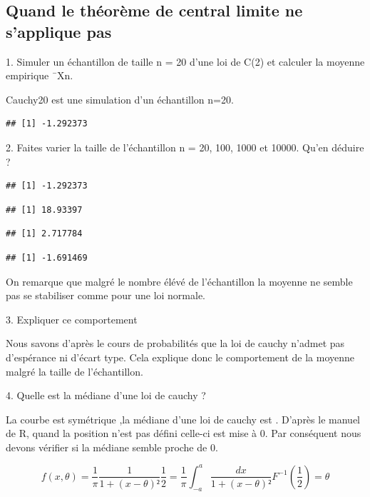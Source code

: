 \documentclass[
]{article}
\begin{document}
\hypertarget{quand-le-thuxe9oruxe8me-de-central-limite-ne-sapplique-pas}{%
\subsection{Quand le théorème de central limite ne s'applique
pas}\label{quand-le-thuxe9oruxe8me-de-central-limite-ne-sapplique-pas}}

1. Simuler un échantillon de taille n = 20 d'une loi de C(2) et calculer
la moyenne empirique ¯Xn.

Cauchy20 est une simulation d'un échantillon n=20.

\begin{verbatim}
## [1] -1.292373
\end{verbatim}

2. Faites varier la taille de l'échantillon n = 20, 100, 1000 et 10000.
Qu'en déduire ?

\begin{verbatim}
## [1] -1.292373
\end{verbatim}

\begin{verbatim}
## [1] 18.93397
\end{verbatim}

\begin{verbatim}
## [1] 2.717784
\end{verbatim}

\begin{verbatim}
## [1] -1.691469
\end{verbatim}

On remarque que malgré le nombre élévé de l'échantillon la moyenne ne
semble pas se stabiliser comme pour une loi normale.

3. Expliquer ce comportement

Nous savons d'après le cours de probabilités que la loi de cauchy
n'admet pas d'espérance ni d'écart type. Cela explique donc le
comportement de la moyenne malgré la taille de l'échantillon.

4. Quelle est la médiane d'une loi de cauchy ?

La courbe est symétrique ,la médiane d'une loi de cauchy est \theta.
D'après le manuel de R, quand la position n'est pas défini celle-ci est
mise à 0. Par conséquent nous devons vérifier si la médiane semble
proche de 0.

\[
f(x,\theta) = \frac{1}{\pi} \frac{1}{1 + (x-\theta)²}
\frac{1}{2} = \frac{1}{\pi} \int_{-a}^{a} \frac{dx}{1+(x-\theta)²}
F^{-1} (\frac{1}{2}) = \theta
\]
\end{document}
